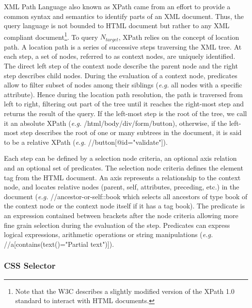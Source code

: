 XML Path Language also known as XPath came from an effort to provide a common syntax and semantics to identify parts of an XML document\cite{W3C2016}. Thus, the query language is not bounded to HTML document but rather to any XML compliant document\footnote{Note that the W3C describes a slightly modified version of the XPath 1.0 standard to interact with HTML documents.}. To query $N_{target}$, XPath relies on the concept of location path. A location path\cite{Gottlob2002} is a series of successive steps traversing the XML tree. At each step, a set of nodes, referred to as context nodes, are uniquely identified. The direct left step of the context node describe the parent node and the right step describes child nodes. During the evaluation of a context node, predicates allow to filter subset of nodes among their siblings (\emph{e.g.} all nodes with a specific attribute). Hence during the location path resolution, the path is traversed from left to right, filtering out part of the tree until it reaches the right-most step and returns the result of the query. If the left-most step is the root of the tree, we call it an absolute XPath (\emph{e.g.} /html/body/div/form/button), otherwise, if the left-most step describes the root of one or many subtrees in the document, it is said to be a relative XPath (\emph{e.g.} //button[@id="validate"]). 

Each step can be defined by a selection node criteria, an optional axis relation and an optional set of predicates\cite{Barton2003}. The selection node criteria defines the element tag from the HTML document. An axis represents a relationship to the context node, and locates relative nodes (parent, self, attributes, preceding, etc.) in the document (\emph{e.g.} //ancestor-or-self::book which selects all ancestors of type book of the context node or the context node itself if it has a tag book). The predicate is an expression contained between brackets after the node criteria allowing more fine grain selection during the evaluation of the step. Predicates can express logical expressions, arithmetic operations or string manipulations \cite{Gottlob2005} (\emph{e.g.} //a[contains(text()="Partial text")]).

\subsubsection{CSS Selector}
\label{sec:hpath-introduction-css-selector}


